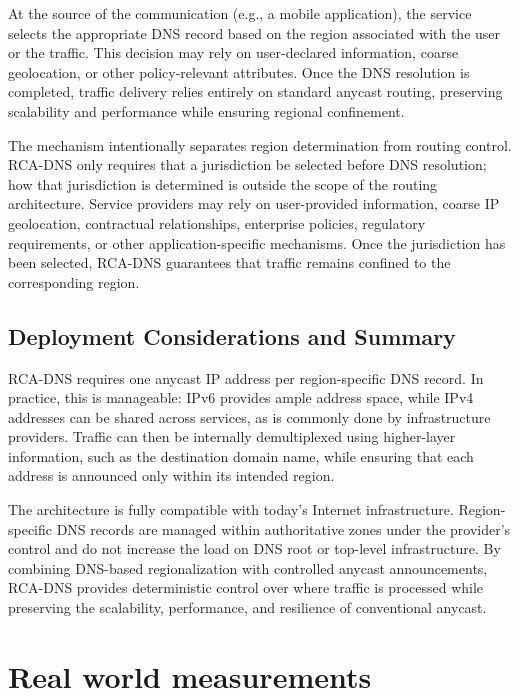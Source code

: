 \documentclass[acmsmall]{acmart}
\begin{document}
At the source of the communication (e.g., a mobile application), the service selects the appropriate DNS record based on the region associated with the user or the traffic. This decision may rely on user-declared information, coarse geolocation, or other policy-relevant attributes. Once the DNS resolution is completed, traffic delivery relies entirely on standard anycast routing, preserving scalability and performance while ensuring regional confinement.

The mechanism intentionally separates region determination from routing control. RCA-DNS only requires that a jurisdiction be selected before DNS resolution; how that jurisdiction is determined is outside the scope of the routing architecture. Service providers may rely on user-provided information, coarse IP geolocation, contractual relationships, enterprise policies, regulatory requirements, or other application-specific mechanisms. Once the jurisdiction has been selected, RCA-DNS guarantees that traffic remains confined to the corresponding region.

\subsection{Deployment Considerations and Summary}

RCA-DNS requires one anycast IP address per region-specific DNS record. In practice, this is manageable: IPv6 provides ample address space, while IPv4 addresses can be shared across services, as is commonly done by infrastructure providers. Traffic can then be internally demultiplexed using higher-layer information, such as the destination domain name, while ensuring that each address is announced only within its intended region.

The architecture is fully compatible with today's Internet infrastructure. Region-specific DNS records are managed within authoritative zones under the provider's control and do not increase the load on DNS root or top-level infrastructure. By combining DNS-based regionalization with controlled anycast announcements, RCA-DNS provides deterministic control over where traffic is processed while preserving the scalability, performance, and resilience of conventional anycast.

\section{Real world measurements}
\label{sec:experiment}
\end{document}
